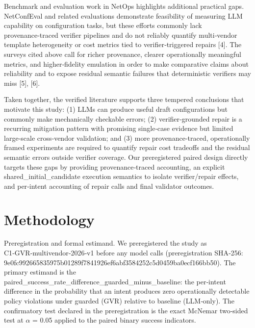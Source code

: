 \documentclass[conference]{IEEEtran}
\begin{document}
Benchmark and evaluation work in NetOps highlights additional practical gaps. NetConfEval and related evaluations demonstrate feasibility of measuring LLM capability on configuration tasks, but these efforts commonly lack provenance‑traced verifier pipelines and do not reliably quantify multi‑vendor template heterogeneity or cost metrics tied to verifier‑triggered repairs [4]. The surveys cited above call for richer provenance, clearer operationally meaningful metrics, and higher‑fidelity emulation in order to make comparative claims about reliability and to expose residual semantic failures that deterministic verifiers may miss [5], [6].

Taken together, the verified literature supports three tempered conclusions that motivate this study: (1) LLMs can produce useful draft configurations but commonly make mechanically checkable errors; (2) verifier‑grounded repair is a recurring mitigation pattern with promising single‑case evidence but limited large‑scale cross‑vendor validation; and (3) more provenance‑traced, operationally framed experiments are required to quantify repair cost tradeoffs and the residual semantic errors outside verifier coverage. Our preregistered paired design directly targets these gaps by providing provenance‑traced accounting, an explicit shared\_initial\_candidate execution semantics to isolate verifier/repair effects, and per‑intent accounting of repair calls and final validator outcomes.

\section{Methodology}
Preregistration and formal estimand. We preregistered the study as C1‑GVR‑multivendor‑2026‑v1 before any model calls (preregistration SHA‑256: 9e0fc992\allowbreak{}66583597\allowbreak{}5b01289f\allowbreak{}7841926e\allowbreak{}f6abf358\allowbreak{}4252c5d0\allowbreak{}459ba0ec\allowbreak{}f166bb50). The primary estimand is the paired\_success\_rate\_difference\_guarded\_minus\_baseline: the per‑intent difference in the probability that an intent produces zero operationally detectable policy violations under guarded (GVR) relative to baseline (LLM‑only). The confirmatory test declared in the preregistration is the exact McNemar two‑sided test at \ensuremath{\alpha} = 0.05 applied to the paired binary success indicators.
\end{document}
